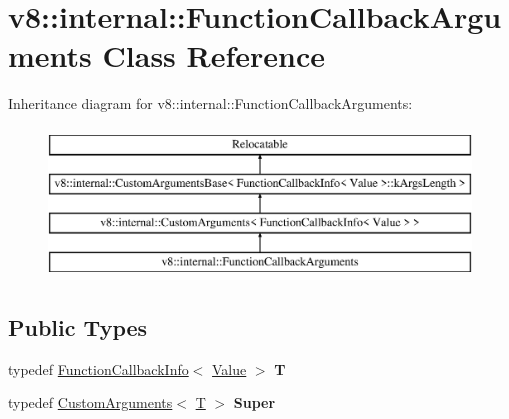 \hypertarget{classv8_1_1internal_1_1_function_callback_arguments}{}\section{v8\+:\+:internal\+:\+:Function\+Callback\+Arguments Class Reference}
\label{classv8_1_1internal_1_1_function_callback_arguments}
Inheritance diagram for v8\+:\+:internal\+:\+:Function\+Callback\+Arguments\+:\begin{figure}[H]
\begin{center}
\leavevmode
\includegraphics[height=4.000000cm]{classv8_1_1internal_1_1_function_callback_arguments}
\end{center}
\end{figure}
\subsection*{Public Types}
\begin{DoxyCompactItemize}
\item 
typedef \hyperlink{classv8_1_1_function_callback_info}{Function\+Callback\+Info}$<$ \hyperlink{classv8_1_1_value}{Value} $>$ {\bfseries T}\hypertarget{classv8_1_1internal_1_1_function_callback_arguments_a890c9aefecb1702b70b70b2f8dd9aa48}{}\label{classv8_1_1internal_1_1_function_callback_arguments_a890c9aefecb1702b70b70b2f8dd9aa48}

\item 
typedef \hyperlink{classv8_1_1internal_1_1_custom_arguments}{Custom\+Arguments}$<$ \hyperlink{classv8_1_1_function_callback_info}{T} $>$ {\bfseries Super}\hypertarget{classv8_1_1internal_1_1_function_callback_arguments_a9f38caba6a1d9692f7244e8f69f72a11}{}\label{classv8_1_1internal_1_1_function_callback_arguments_a9f38caba6a1d9692f7244e8f69f72a11}

\end{DoxyCompactItemize}
